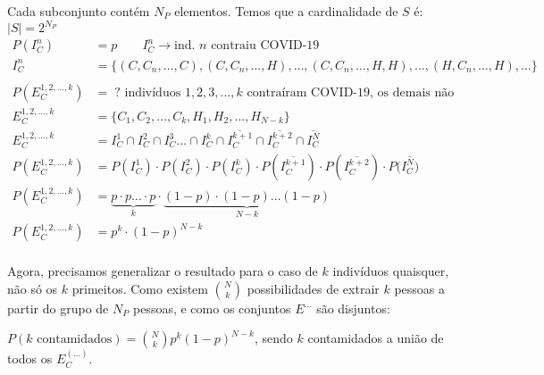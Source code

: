 \documentclass{article}
\newcommand\ov[1]{\overline{#1}}
\begin{document}
Cada subconjunto contém $N_P$ elementos. Temos que a cardinalidade de $S$ é: $|S| = 2^{N_P}$
\begin{align*}
	P(I^n_C)              & = p \qquad I^n_C \rightarrow \text{ind. $n$ contraiu COVID-19}                                            \\
	I^n_C                 & = \{(C,C_n,\ldots,C),(C,C_n,\ldots,H),\ldots,(C,C_n,\ldots,H,H),\ldots,(H,C_n,\ldots,H),\ldots\}          \\\\
	P(E^{1,2,\ldots,k}_C) & = \; ? \text{ indivíduos } 1,2,3,\ldots,k \text{ contraíram COVID-19, os demais não}                      \\
	E^{1,2,\ldots,k}_C    & = \{C_1,C_2,\ldots,C_k,H_1,H_2,\ldots,H_{N-k}\}                                                           \\
	E^{1,2,\ldots,k}_C    & = I_C^1 \cap I_C^2 \cap I_C^3 \ldots \cap I_C^k \cap \ov{I_C^{k+1}} \cap \ov{I_C^{k+2}} \cap \ov{I_C^{N}} \\
	P(E^{1,2,\ldots,k}_C) & = P(I_C^1) \cdot P(I_C^2) \cdot P(I_C^k) \cdot P(\ov{I_C^{k+1}}) \cdot
	P(\ov{I_C^{k+2}}) \cdot P(\ov{I_C^N)}                                                                                             \\
	P(E^{1,2,\ldots,k}_C) & = \underbrace{p \cdot p \ldots \cdot p}_{k} \cdot \underbrace{(1-p)
	\cdot (1-p) \ldots (1-p)}_{N-k}                                                                                                   \\
	P(E^{1,2,\ldots,k}_C) & = p^k \cdot (1-p)^{N-k}
\end{align*}
\\[-0.5em]
Agora, precisamos generalizar o resultado para o caso de $k$ indivíduos quaisquer, não só os $k$
primeitos. Como existem ${N \choose k}$ possibilidades de extrair $k$ pessoas a partir do grupo de
$N_P$ pessoas, e como os conjuntos $E^{\ldots}$ são disjuntos:

$P(k \text{ contamidados}) = {N \choose k} p^k (1-p)^{N-k}$, sendo $k$ contamidados a união de
todos os $E^{(\ldots)}_C$.
\end{document}
